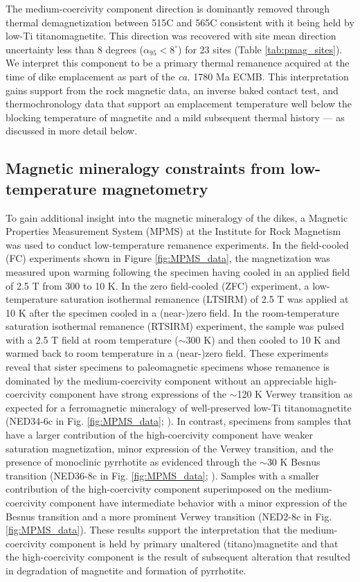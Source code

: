 \documentclass[draft]{agujournal2019}
\begin{document}
The medium-coercivity component direction is dominantly removed through thermal demagnetization between 515\textdegree C and 565\textdegree C consistent with it being held by low-Ti titanomagnetite. This direction was recovered with site mean direction uncertainty less than 8 degrees ($\alpha_{95}<8^{\circ}$) for 23 sites (Table \ref{tab:pmag_sites}). We interpret this component to be a primary thermal remanence acquired at the time of dike emplacement as part of the \textit{ca.} 1780 Ma ECMB. This interpretation gains support from the rock magnetic data, an inverse baked contact test, and thermochronology data that support an emplacement temperature well below the blocking temperature of magnetite and a mild subsequent thermal history --- as discussed in more detail below. 

\subsection{Magnetic mineralogy constraints from low-temperature magnetometry}

To gain additional insight into the magnetic mineralogy of the dikes, a Magnetic Properties Measurement System (MPMS) at the Institute for Rock Magnetism was used to conduct low-temperature remanence experiments. In the field-cooled (FC) experiments shown in Figure \ref{fig:MPMS_data}, the magnetization was measured upon warming following the specimen having cooled in an applied field of 2.5 T from 300 to 10 K. In the zero field-cooled (ZFC) experiment, a low-temperature saturation isothermal remanence (LTSIRM) of 2.5 T was applied at 10 K after the specimen cooled in a (near-)zero field. In the room-temperature saturation isothermal remanence (RTSIRM) experiment, the sample was pulsed with a 2.5 T field at room temperature ($\sim$300 K) and then cooled to 10 K and warmed back to room temperature in a (near-)zero field. These experiments reveal that sister specimens to paleomagnetic specimens whose remanence is dominated by the medium-coercivity component without an appreciable high-coercivity component have strong expressions of the $\sim$120 K Verwey transition as expected for a ferromagnetic mineralogy of well-preserved low-Ti titanomagnetite (NED34-6c in Fig. \ref{fig:MPMS_data}; ). In contrast, specimens from samples that have a larger contribution of the high-coercivity component have weaker saturation magnetization, minor expression of the Verwey transition, and the presence of monoclinic pyrrhotite as evidenced through the $\sim$30 K Besnus transition (NED36-8c in Fig. \ref{fig:MPMS_data}; ). Samples with a smaller contribution of the high-coercivity component superimposed on the medium-coercivity component have intermediate behavior with a minor expression of the Besnus transition and a more prominent Verwey transition (NED2-8c in Fig. \ref{fig:MPMS_data}). These results support the interpretation that the medium-coercivity component is held by primary unaltered (titano)magnetite and that the high-coercivity component is the result of subsequent alteration that resulted in degradation of magnetite and formation of pyrrhotite.
\end{document}
